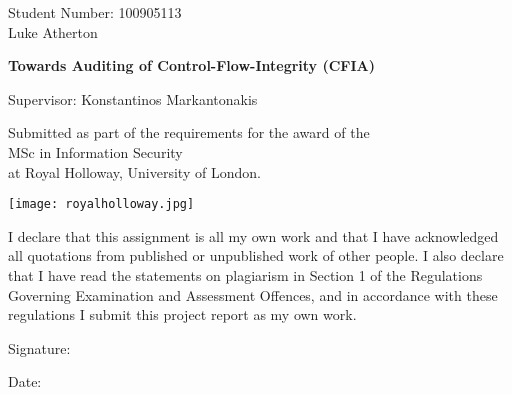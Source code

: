 \begin{titlepage}
    \begin{center}      
		\LARGE
		Student Number: 100905113\\
		Luke Atherton		
		        
        \vspace*{1cm}
        
        \Huge
        \textbf{Towards Auditing of Control-Flow-Integrity (CFIA)}
 
        \vspace{0.5cm}
        \LARGE
        Supervisor: Konstantinos Markantonakis
 
        \vspace{1cm}
 
        \vfill
        
 		\large
        Submitted as part of the requirements for the award of the\\
        MSc in Information Security\\
        at Royal Holloway, University of London.
 
        \texttt{[image: royalholloway.jpg]}
        
        \Large
        
        \date{\today}
        
 
    \end{center}
    \normalsize

\noindent
I declare that this assignment is all my own work and that I have acknowledged all quotations from published or unpublished work of other people.  I also declare that I have read the statements on plagiarism in Section 1 of the Regulations Governing Examination and Assessment Offences, and in accordance with these regulations I submit this project report as my own work.

\noindent
Signature:
			
\noindent
Date:
\end{titlepage}